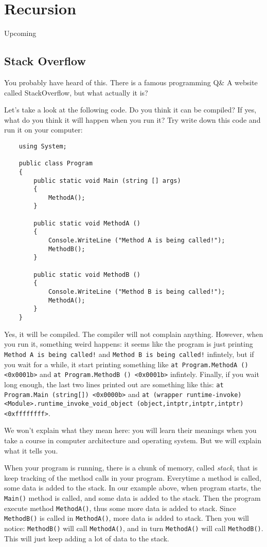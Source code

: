 \documentclass[../main.tex]{subfiles}
\begin{document}
    \section{Recursion}
    Upcoming
    \subsection{Stack Overflow}
    You probably have heard of this. There is a famous programming Q\& A website
    called StackOverflow, but what actually it is?

    Let's take a look at the following code. Do you think it can be compiled?
    If yes, what do you think it will happen when you run it? Try write down
    this code and run it on your computer:

    \begin{verbatim}
    using System;

    public class Program
    {
        public static void Main (string [] args)
        {
            MethodA();
        }

        public static void MethodA ()
        {
            Console.WriteLine ("Method A is being called!");
            MethodB();
        }

        public static void MethodB ()
        {
            Console.WriteLine ("Method B is being called!");
            MethodA();
        }
    }
    \end{verbatim}

    Yes, it will be compiled. The \csharp compiler will not complain anything.
    However, when you run it, something weird happens: it seems like the program
    is just printing \texttt{Method A is being called!} and
    \texttt{Method B is being called!} infintely, but if you wait for a while,
    it start printing something like \texttt{at Program.MethodA () <0x0001b>}
    and \texttt{at Program.MethodB () <0x0001b>} infintely. Finally, if you wait
    long enough, the last two lines printed out are something like this:
    \texttt{at Program.Main (string[]) <0x0000b>} and
    \texttt{at (wrapper runtime-invoke) <Module>.runtime\_invoke\_void\_object (object,intptr,intptr,intptr) <0xffffffff>}.

    We won't explain what they mean here: you will learn their meanings when you
    take a course in computer architecture and operating system. But we will
    explain what it tells you.

    When your program is running, there is a chunk of memory, called \emph{stack},
    that is keep tracking of the method calls in your program. Everytime a method
    is called, some data is added to the stack. In our example above, when program
    starts, the \texttt{Main()} method is called, and some data is added to the
    stack. Then the program execute method \texttt{MethodA()}, thus some more
    data is added to stack. Since \texttt{MethodB()} is called in \texttt{MethodA()},
    more data is added to stack. Then you will notice: \texttt{MethodB()} will call
    \texttt{MethodA()}, and in turn \texttt{MethodA()} will call \texttt{MethodB()}.
    This will just keep adding a lot of data to the stack.
\end{document}
